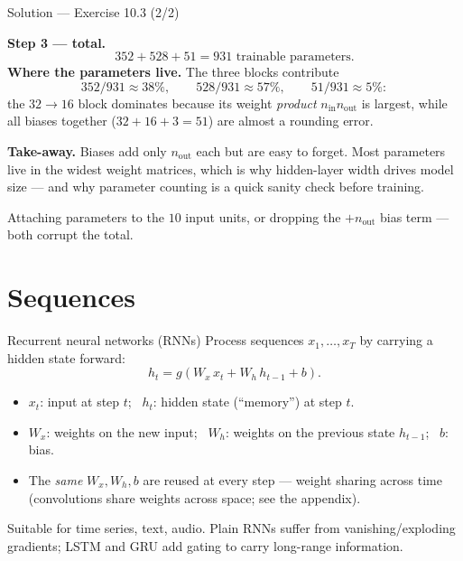 \documentclass[aspectratio=169,11pt]{beamer}
\begin{document}
\begin{frame}{Solution --- Exercise 10.3 (2/2)}
\begin{solutionbox}
  \textbf{Step 3 --- total.}
  \[
    352 + 528 + 51 = \boxed{931} \text{ trainable parameters.}
  \]
  \textbf{Where the parameters live.} The three blocks contribute
  \[
    352/931 \approx 38\%, \qquad 528/931 \approx 57\%, \qquad 51/931 \approx 5\%:
  \]
  the $32 \to 16$ block dominates because its weight \emph{product}
  $n_{\text{in}} n_{\text{out}}$ is largest, while all biases together
  ($32 + 16 + 3 = 51$) are almost a rounding error.

  \medskip
  \textbf{Take-away.} Biases add only $n_{\text{out}}$ each but are
  easy to forget. Most parameters live in the widest weight matrices,
  which is why hidden-layer width drives model size --- and why parameter
  counting is a quick sanity check before training.

\end{solutionbox}
\begin{mistake}
  Attaching parameters to the $10$ input units, or dropping the
  $+n_{\text{out}}$ bias term --- both corrupt the total.
\end{mistake}
\end{frame}

\section{Sequences}

\begin{frame}{Recurrent neural networks (RNNs)}
  Process sequences $x_1, \ldots, x_T$ by carrying a hidden state forward:
  \[
    \boxed{\,h_t = g\!\left(W_x\, x_t + W_h\, h_{t-1} + b\right).\,}
  \]
  \begin{readme}
    \begin{itemize}
      \item $x_t$: input at step $t$; \ $h_t$: hidden state (``memory'') at step $t$.
      \item $W_x$: weights on the new input; \ $W_h$: weights on the previous state
            $h_{t-1}$; \ $b$: bias.
      \item The \emph{same} $W_x,W_h,b$ are reused at every step --- weight sharing
            across time (convolutions share weights across space; see the appendix).
    \end{itemize}
  \end{readme}
  \begin{takeaway}
    Suitable for time series, text, audio. Plain RNNs suffer from
    vanishing/exploding gradients; LSTM and GRU add gating to carry long-range
    information.
  \end{takeaway}
\end{frame}
\end{document}
